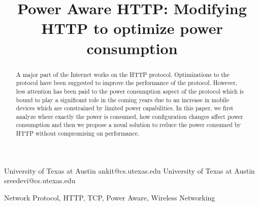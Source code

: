 \documentclass{sigplanconf}
\begin{document}
\setlength{\pdfpageheight}{\paperheight}
\setlength{\pdfpagewidth}{\paperwidth}






\title{Power Aware HTTP: Modifying HTTP to optimize power consumption}


{University of Texas at Austin}
           {ankit@cs.utexas.edu}
{University of Texas at Austin}
           {sreedevi@cs.utexas.edu}

\maketitle

\begin{abstract}
\noindent A major part of the Internet works on the HTTP protocol. Optimizations to the protocol have been suggested to improve the performance of the protocol. However, less attention has been paid to the power consumption aspect of the protocol which is bound to play a significant role in the coming years due to an increase in mobile devices which are constrained by limited power capabilities. In this paper, we first analyze where exactly the power is consumed, how configuration changes affect power consumption and then we propose a noval solution to reduce the power consumed by HTTP without compromising on performance. 

\end{abstract}


\keywords
Network Protocol, HTTP, TCP, Power Aware, Wireless Networking
\end{document}
